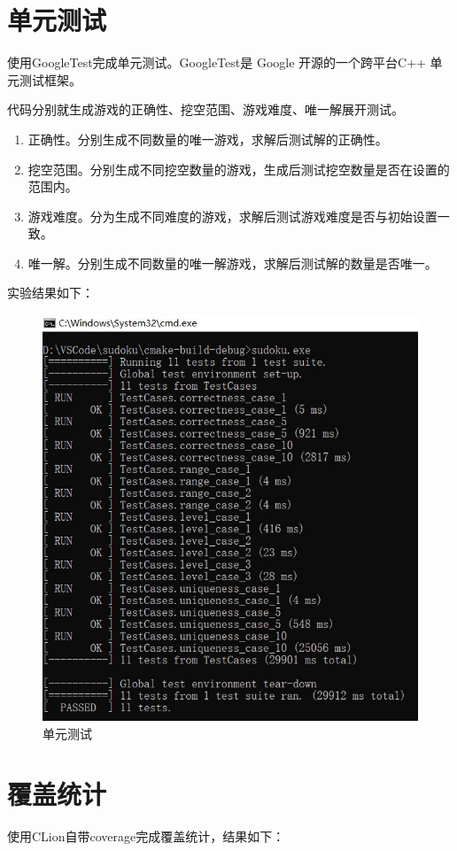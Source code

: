 \documentclass[a4paper]{article}
\begin{document}
\section{单元测试}使用GoogleTest完成单元测试。GoogleTest是 Google 开源的一个跨平台C++ 单元测试框架。

代码分别就生成游戏的正确性、挖空范围、游戏难度、唯一解展开测试。
\begin{enumerate}
  \item 正确性。分别生成不同数量的唯一游戏，求解后测试解的正确性。
  \item 挖空范围。分别生成不同挖空数量的游戏，生成后测试挖空数量是否在设置的范围内。
  \item 游戏难度。分为生成不同难度的游戏，求解后测试游戏难度是否与初始设置一致。
  \item 唯一解。分别生成不同数量的唯一解游戏，求解后测试解的数量是否唯一。
\end{enumerate}

实验结果如下：

\begin{figure}[H]
  \centering
  \includegraphics[scale=0.9]{images/test.jpg}
  \caption{单元测试}
  \label{fig:test}
\end{figure}
\section{覆盖统计}
使用CLion自带coverage完成覆盖统计，结果如下：
\end{document}

